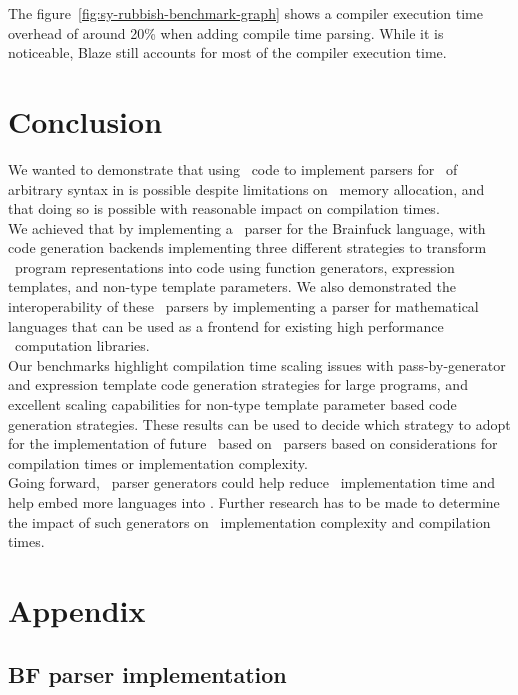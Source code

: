 \documentclass[../../main.tex]{subfiles}
\begin{document}
The figure~\ref{fig:sy-rubbish-benchmark-graph} shows a compiler execution time
overhead of around 20\% when adding compile time parsing.
While it is noticeable, Blaze still accounts for most of the compiler execution
time.

\section{Conclusion}

We wanted to demonstrate that using \constexpr~code to implement parsers for
\dsel~of arbitrary syntax in  is possible despite limitations on
\constexpr~memory allocation, and that doing so is possible with reasonable
impact on compilation times.\\

We achieved that by implementing a \constexpr~parser for the Brainfuck language,
with code generation backends implementing three different strategies to
transform \constexpr~program representations into code using function
generators, expression templates, and non-type template parameters.
We also demonstrated the interoperability of these \constexpr~parsers by
implementing a parser for mathematical languages that can be used as a frontend
for existing high performance \cpp~computation libraries.\\

Our benchmarks highlight compilation time scaling issues with pass-by-generator
and expression template code generation strategies for large programs, and
excellent scaling capabilities for non-type template parameter based code
generation strategies. These results can be used to decide which strategy to
adopt for the implementation of future \dsel~based on \constexpr~parsers
based on considerations for compilation times or implementation complexity.\\

Going forward, \constexpr~parser generators could help reduce
\dsel~implementation time and help embed more languages into . Further research
has to be made to determine the impact of such generators on
\dsel~implementation complexity and compilation times.


\appendix
\section{Appendix}

\subsection{BF parser implementation}\label{app:bf-parser}


\end{document}
